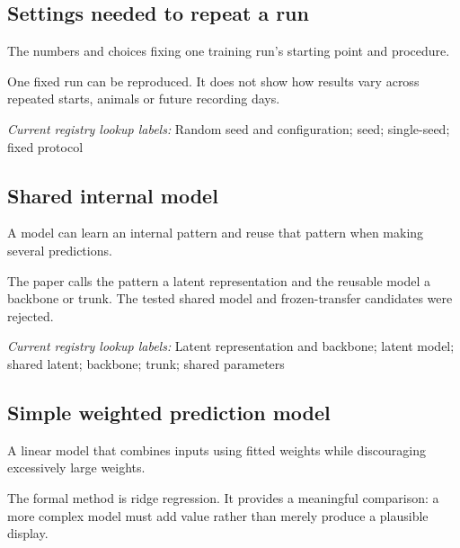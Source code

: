 \begin{samepage}
\subsection*{Settings needed to repeat a run}
\noindent The numbers and choices fixing one training run’s starting point and procedure.\par
\end{samepage}
\begin{samepage}
\noindent One fixed run can be reproduced. It does not show how results vary across repeated starts, animals or future recording days.\par\nopagebreak[4]

\end{samepage}


\noindent\textit{Current registry lookup labels:} Random seed and configuration; seed; single-seed; fixed protocol\par

\begin{samepage}
\subsection*{Shared internal model}
\noindent A model can learn an internal pattern and reuse that pattern when making several predictions.\par
\end{samepage}
\begin{samepage}
\noindent The paper calls the pattern a latent representation and the reusable model a backbone or trunk. The tested shared model and frozen-transfer candidates were rejected.\par\nopagebreak[4]

\end{samepage}


\noindent\textit{Current registry lookup labels:} Latent representation and backbone; latent model; shared latent; backbone; trunk; shared parameters\par

\begin{samepage}
\subsection*{Simple weighted prediction model}
\noindent A linear model that combines inputs using fitted weights while discouraging excessively large weights.\par
\end{samepage}
\begin{samepage}
\noindent The formal method is ridge regression. It provides a meaningful comparison: a more complex model must add value rather than merely produce a plausible display.\par\nopagebreak[4]

\end{samepage}


